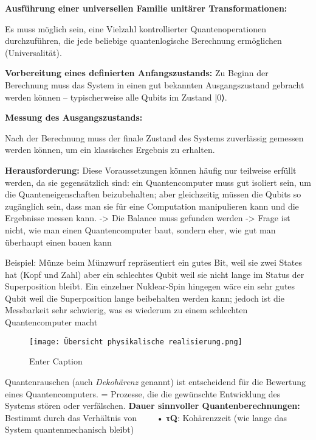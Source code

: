  
 
    \item \textbf{Ausführung einer universellen Familie unitärer Transformationen:}

 Es muss möglich sein, eine Vielzahl kontrollierter Quantenoperationen durchzuführen, die jede beliebige quantenlogische Berechnung ermöglichen (Universalität).
 
    \item \textbf{Vorbereitung eines definierten Anfangszustands:}
 Zu Beginn der Berechnung muss das System in einen gut bekannten Ausgangszustand gebracht werden können – typischerweise alle Qubits im Zustand |0⟩.

    \item \textbf{Messung des Ausgangszustands:}

 Nach der Berechnung muss der finale Zustand des Systems zuverlässig gemessen werden können, um ein klassisches Ergebnis zu erhalten. 

\textbf{Herausforderung: }
Diese Voraussetzungen können häufig nur teilweise erfüllt werden, da sie gegensätzlich sind: ein Quantencomputer muss gut isoliert sein, um die Quanteneigenschaften beizubehalten; aber gleichzeitig müssen die Qubits so zugänglich sein, dass man sie für eine Computation manipulieren kann und die Ergebnisse messen kann. 
-> Die Balance muss gefunden werden
-> Frage ist nicht, wie man einen Quantencomputer baut, sondern eher, wie gut man überhaupt einen bauen kann

Beispiel: Münze beim Münzwurf repräsentiert ein gutes Bit, weil sie zwei States hat (Kopf und Zahl) aber ein schlechtes Qubit weil sie nicht lange im Status der Superposition bleibt. Ein einzelner Nuklear-Spin hingegen wäre ein sehr gutes Qubit weil die Superposition lange beibehalten werden kann; jedoch ist die Messbarkeit sehr schwierig, was es wiederum zu einem schlechten Quantencomputer macht

\begin{figure}
    \centering
    \texttt{[image: Übersicht physikalische realisierung.png]}
    \caption{Enter Caption}
    \label{fig:enter-label}
\end{figure}
\cite{nielsen_michael_a_and_isaac_l_chuang_quantum_2010}

Quantenrauschen (auch \textit{Dekohärenz} genannt) ist entscheidend für die Bewertung eines Quantencomputers.
= Prozesse, die die gewünschte Entwicklung des Systems stören oder verfälschen.
\textbf{Dauer sinnvoller Quantenberechnungen:}
 Bestimmt durch das Verhältnis von
   • \textbf{τQ}: Kohärenzzeit (wie lange das System quantenmechanisch bleibt)


